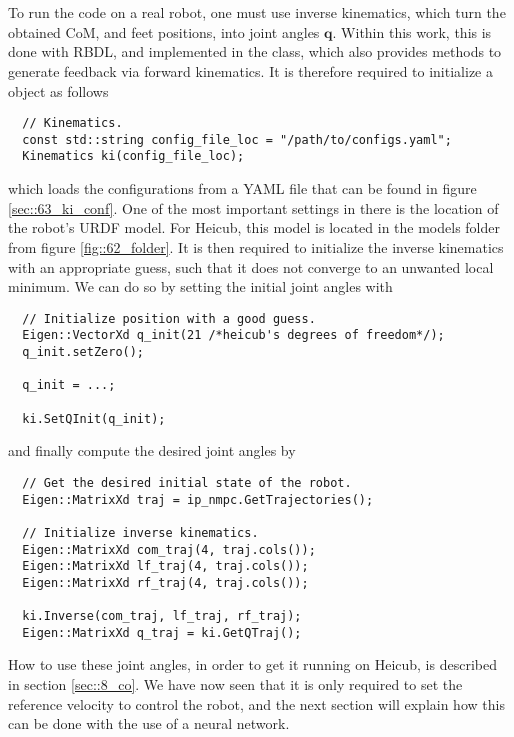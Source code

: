 \\
\\
To run the code on a real robot, one must use inverse kinematics, which turn the obtained CoM, and feet positions, into joint angles $\bm{q}$. Within this work, this is done with RBDL, and implemented in the  class, which also provides methods to generate feedback via forward kinematics. It is therefore required to initialize a  object as follows
\begin{verbatim}
  // Kinematics.
  const std::string config_file_loc = "/path/to/configs.yaml";
  Kinematics ki(config_file_loc);
\end{verbatim}
which loads the configurations from a YAML file that can be found in figure \ref{sec::63_ki_conf}. One of the most important settings in there is the location of the robot's URDF model. For Heicub, this model is located in the models folder from figure \ref{fig::62_folder}.  It is then required to initialize the inverse kinematics with an appropriate guess, such that it does not converge to an unwanted local minimum. We can do so by setting the initial joint angles with
\begin{verbatim}
  // Initialize position with a good guess.
  Eigen::VectorXd q_init(21 /*heicub's degrees of freedom*/);
  q_init.setZero();

  q_init = ...;

  ki.SetQInit(q_init);
\end{verbatim}
and finally compute the desired joint angles by
\begin{verbatim}
  // Get the desired initial state of the robot.
  Eigen::MatrixXd traj = ip_nmpc.GetTrajectories();

  // Initialize inverse kinematics.
  Eigen::MatrixXd com_traj(4, traj.cols());     
  Eigen::MatrixXd lf_traj(4, traj.cols());  
  Eigen::MatrixXd rf_traj(4, traj.cols());

  ki.Inverse(com_traj, lf_traj, rf_traj);
  Eigen::MatrixXd q_traj = ki.GetQTraj();
\end{verbatim}
How to use these joint angles, in order to get it running on Heicub, is described in section \ref{sec::8_co}. We have now seen that it is only required to set the reference velocity to control the robot, and the next section will explain how this can be done with the use of a neural network.
\\
